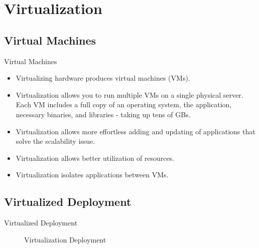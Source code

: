 
\section{Virtualization}\label{sec:virtualization}

\subsection{Virtual Machines}\label{subsec:virtual-machines}
\begin{frame}{Virtual Machines}
    \begin{itemize}[<+- | alert@+>]
        \item Virtualizing hardware produces virtual machines (VMs).
        \item Virtualization allows you to run multiple VMs on a single physical server.
        Each VM includes a full copy of an operating system, the application, necessary binaries, and libraries - taking up tens of GBs.
        \item Virtualization allows more effortless adding and updating of applications that solve the scalability issue.
        \item Virtualization allows better utilization of resources.
        \item Virtualization isolates applications between VMs.
    \end{itemize}
\end{frame}

\subsection{Virtualized Deployment}\label{subsec:virtualized-deployment}
\begin{frame}{Virtualized Deployment}
    \begin{figure}[!t]
        \raggedright
        
        \caption{Virtualization Deployment}
    \end{figure}
\end{frame}

